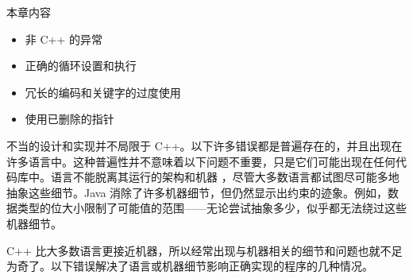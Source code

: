 本章内容

\begin{itemize}
\item
非 C++ 的异常

\item
正确的循环设置和执行

\item
冗长的编码和关键字的过度使用

\item
使用已删除的指针
\end{itemize}

不当的设计和实现并不局限于 C++。以下许多错误都是普遍存在的，并且出现在许多语言中。这种普遍性并不意味着以下问题不重要，只是它们可能出现在任何代码库中。语言不能脱离其运行的架构和机器 ，尽管大多数语言都试图尽可能多地抽象这些细节。Java 消除了许多机器细节，但仍然显示出约束的迹象。例如，数据类型的位大小限制了可能值的范围——无论尝试抽象多少，似乎都无法绕过这些机器细节。

C++ 比大多数语言更接近机器，所以经常出现与机器相关的细节和问题也就不足为奇了。以下错误解决了语言或机器细节影响正确实现的程序的几种情况。

